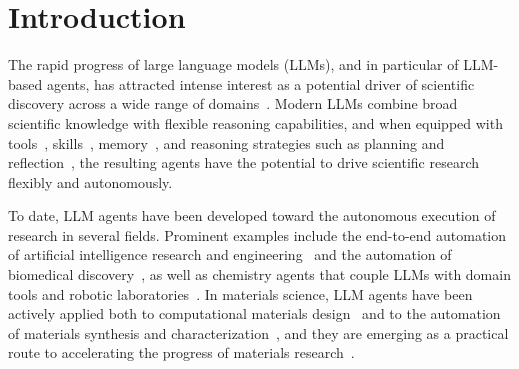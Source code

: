 \section{Introduction}

The rapid progress of large language models (LLMs), and in particular of
LLM-based agents, has attracted intense interest as a potential driver of
scientific discovery across a wide range of
domains~\cite{Lu2026AIScientist,Gottweis2026CoScientist,Mitchener2025Kosmos,Zhang2026AgenticMaterials}.
Modern LLMs combine broad scientific knowledge with flexible reasoning
capabilities, and when equipped with
tools~\cite{Yao2023ReAct,Anthropic2024MCP,Hou2025MCP},
skills~\cite{Wang2023Voyager,Jiang2026AgenticSkills},
memory~\cite{Chhikara2025Mem0,Gao2026SelfEvolvingAgents}, and reasoning strategies such
as planning and
reflection~\cite{Yao2023ReAct,Sun2023AdaPlanner,Shinn2023Reflexion},
the resulting
agents have the potential to drive scientific research flexibly and
autonomously.

To date, LLM agents have been developed toward the autonomous execution of
research in several fields.
Prominent examples include the end-to-end automation of artificial
intelligence research and engineering~\cite{Lu2026AIScientist,Jin2026Arbor}
and the automation of biomedical
discovery~\cite{Gottweis2026CoScientist,Ghareeb2025Robin,Mitchener2025Kosmos,Ke2025BioDisco},
as well as chemistry agents that couple LLMs with domain tools and robotic
laboratories~\cite{Bran2024ChemCrow,Boiko2023Coscientist,Darvish2025ORGANA}.
In materials science, LLM agents have been actively applied both to
computational materials
design~\cite{Jia2024LLMatDesign,Takahara2025MatAgent,Nduma2025Crystalyse,Kim2026Materealize,Zou2025ElAgente,Pham2026ChemGraph,Deng2026AtomisticSkills}
and to the automation of materials synthesis and
characterization~\cite{Fei2026AgenticLLM,YanguasGil2026ALDOptimization,shi2026knowledge,mandal2025evaluating,vriza2026operating},
and they are emerging as a practical route to accelerating the progress
of materials research~\cite{Zhang2026AgenticMaterials}.

